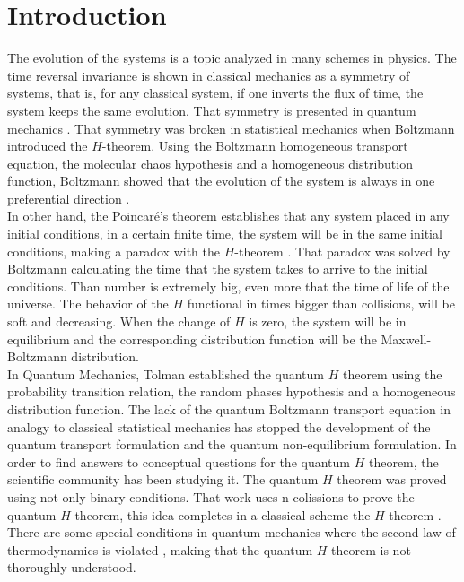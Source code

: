\documentclass{article}
\begin{document}
\section{Introduction}
The evolution of the systems is a topic analyzed in many schemes in physics. The time reversal invariance is shown in classical mechanics as a symmetry of systems, that is, for any classical system, if one inverts the flux of time, the system keeps the same evolution\cite{goldstein}. That symmetry is presented in quantum mechanics \cite{sakurai}. That symmetry was broken in statistical mechanics when Boltzmann introduced the $H$-theorem. Using the Boltzmann homogeneous transport equation, the molecular chaos hypothesis and a homogeneous distribution function, Boltzmann showed that the evolution of the system is always in one preferential direction \cite{huang}.\\
In other hand, the Poincaré's theorem establishes that any system placed in any initial conditions, in a certain finite time, the system will be in the same initial conditions, making a paradox with the $H$-theorem \cite{paradox1, paradox2}. That paradox was solved by Boltzmann calculating the time that the system takes to arrive to the initial conditions. Than number is extremely big, even more that the time of life of the universe.
The behavior of the $H$ functional in times bigger than collisions, will be soft and decreasing. When the change of $H$ is zero, the system will be in equilibrium and the corresponding distribution function will be the Maxwell-Boltzmann distribution\cite{huang, patrick}. \\
In Quantum Mechanics, Tolman established the quantum $H$ theorem \cite{tolman} using the probability transition relation, the random phases hypothesis and a homogeneous distribution function. The lack of the quantum Boltzmann transport equation in analogy to classical statistical mechanics has stopped the development of the quantum transport formulation and the quantum non-equilibrium formulation. In order to find answers to conceptual questions for the quantum $H$ theorem, the scientific community has been studying it. The quantum $H$ theorem was proved using not only binary conditions. That work uses n-colissions to prove the quantum $H$ theorem, this idea completes in a classical scheme the $H$ theorem \cite{binary}. There are some special conditions in quantum mechanics where the second law of thermodynamics is violated \cite{contradictions}, making that the quantum $H$ theorem is not thoroughly understood.\\
\end{document}
